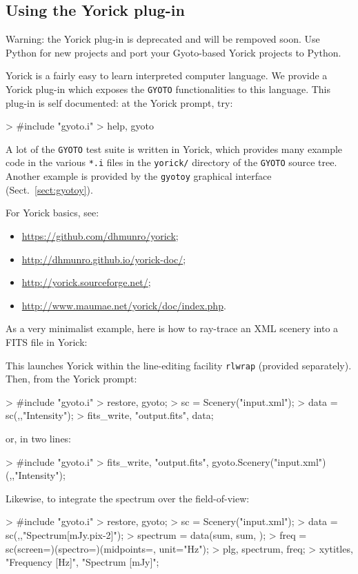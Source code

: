 \documentclass[a4paper,12pt]{article}
\begin{document}
\subsection{Using the Yorick plug-in}
\label{sect:yorick}
Warning: the Yorick plug-in is deprecated and will be rempoved
soon. Use Python for new projects and port your Gyoto-based Yorick
projects to Python.

Yorick is a fairly easy to learn interpreted computer language. We
provide a Yorick plug-in which exposes the \texttt{GYOTO}
functionalities to this language. This plug-in is self documented: at
the Yorick prompt, try:
\begin{code}
 > #include "gyoto.i"
 > help, gyoto
\end{code}

A lot of the \texttt{GYOTO} test suite is written in Yorick, which
provides many example code in the various \texttt{*.i} files in the
\texttt{yorick/} directory of the \texttt{GYOTO} source tree. Another
example is provided by the \texttt{gyotoy} graphical interface
(Sect.~\ref{sect:gyotoy}).

For Yorick basics, see:
\begin{itemize}
\item \url{https://github.com/dhmunro/yorick};
\item \url{http://dhmunro.github.io/yorick-doc/};
\item \url{http://yorick.sourceforge.net/};
\item \url{http://www.maumae.net/yorick/doc/index.php}.
\end{itemize}

As a very minimalist example, here is how to ray-trace an XML
scenery into a FITS file in Yorick:
This launches Yorick within the line-editing facility \texttt{rlwrap}
(provided separately). Then, from the Yorick prompt:
\begin{code}
 > #include "gyoto.i"
 > restore, gyoto;
 > sc = Scenery("input.xml");
 > data = sc(,,"Intensity");
 > fits_write, "output.fits", data;
\end{code}
or, in two lines:
\begin{code}
 > #include "gyoto.i"
 > fits_write, "output.fits", gyoto.Scenery("input.xml")(,,"Intensity");
\end{code}
Likewise, to integrate the spectrum over the field-of-view:
\begin{code}
 > #include "gyoto.i"
 > restore, gyoto;
 > sc = Scenery("input.xml");
 > data = sc(,,"Spectrum[mJy.pix-2]");
 > spectrum = data(sum, sum, );
 > freq = sc(screen=)(spectro=)(midpoints=, unit="Hz");
 > plg, spectrum, freq;
 > xytitles, "Frequency [Hz]", "Spectrum [mJy]";
\end{code}
\end{document}
